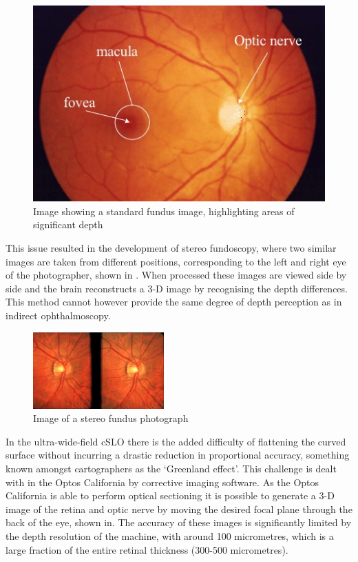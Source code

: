 \begin{figure}[htbp]
\centering
 \includegraphics{figures/normalfundus}
\caption{Image showing a  standard fundus image, highlighting areas of significant depth}
\label{fig:standard}
    \end{figure}

This issue resulted in the development of stereo fundoscopy, where two similar images are taken from different positions, corresponding to the left and right eye of the photographer, shown in . When processed these images are viewed side by side and the brain reconstructs a 3-D image by recognising the depth differences. This method cannot however provide the same degree of depth perception as in indirect ophthalmoscopy.

\begin{figure}[htbp]
\centering
 \includegraphics{figures/stereo}
\caption{Image of a stereo fundus photograph}
\label{fig:stereo}
    \end{figure}

In the ultra-wide-field cSLO there is the added difficulty of flattening the curved surface without incurring a drastic reduction in proportional accuracy, something known amongst cartographers as the ‘Greenland effect’. This challenge is dealt with in the Optos California by corrective imaging software. As the Optos California is able to perform optical sectioning it is possible to generate a 3-D image of the retina and optic nerve by moving the desired focal plane through the back of the eye, shown in. The accuracy of these images is significantly limited by the depth resolution of the machine, with around 100 micrometres, which is a large fraction of the entire retinal thickness (300-500 micrometres).

